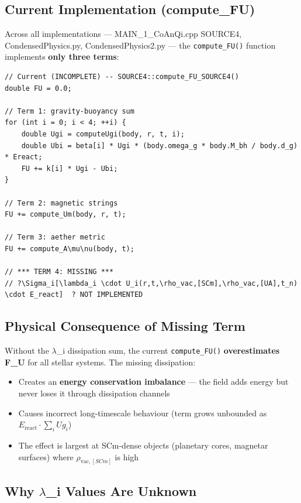 \documentclass[12pt,a4paper]{article}
\begin{document}
\subsection{Current Implementation (compute\_FU)}

Across all implementations --- MAIN\_{1\_CoAnQi}.cpp SOURCE4, CondensedPhysics.py, CondensedPhysics2.py --- the \texttt{compute\_FU()} function implements \textbf{only three terms}:

\begin{verbatim}
// Current (INCOMPLETE) -- SOURCE4::compute_FU_SOURCE4()
double FU = 0.0;

// Term 1: gravity-buoyancy sum
for (int i = 0; i < 4; ++i) {
    double Ugi = computeUgi(body, r, t, i);
    double Ubi = beta[i] * Ugi * (body.omega_g * body.M_bh / body.d_g) * Ereact;
    FU += k[i] * Ugi - Ubi;
}

// Term 2: magnetic strings
FU += compute_Um(body, r, t);

// Term 3: aether metric
FU += compute_A\mu\nu(body, t);

// *** TERM 4: MISSING ***
// ?\Sigma_i[\lambda_i \cdot U_i(r,t,\rho_vac,[SCm],\rho_vac,[UA],t_n) \cdot E_react]  ? NOT IMPLEMENTED
\end{verbatim}

\subsection{Physical Consequence of Missing Term}

Without the $\lambda$\_i dissipation sum, the current \texttt{compute\_FU()} \textbf{overestimates F\_U} for all stellar systems. The missing dissipation:

\begin{itemize}
  \item Creates an \textbf{energy conservation imbalance} --- the field adds energy but never loses it through dissipation channels
  \item Causes incorrect long-timescale behaviour (term grows unbounded as $E_{\text{react}} \cdot \sum_i Ug_i$)
  \item The effect is largest at SCm-dense objects (planetary cores, magnetar surfaces) where $\rho_{\text{vac},[SCm]}$ is high
\end{itemize}

\subsection{Why $\lambda$\_i Values Are Unknown}
\end{document}
